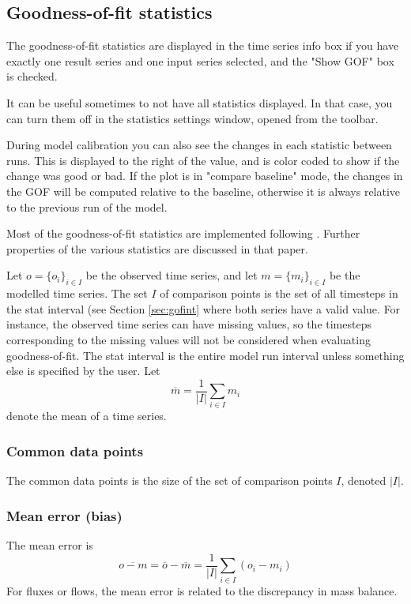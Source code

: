 \documentclass[11pt]{article}
\theoremstyle{definition}
\begin{document}
\subsection{Goodness-of-fit statistics}\label{sec:gof}

The goodness-of-fit statistics are displayed in the time series info box if you have exactly one result series and one input series selected, and the "Show GOF" box is checked.

It can be useful sometimes to not have all statistics displayed. In that case, you can turn them off in the statistics settings window, opened from the toolbar.

During model calibration you can also see the changes in each statistic between runs. This is displayed to the right of the value, and is color coded to show if the change was good or bad. If the plot is in "compare baseline" mode, the changes in the GOF will be computed relative to the baseline, otherwise it is always relative to the previous run of the model.

Most of the goodness-of-fit statistics are implemented following \cite{krause05}. Further properties of the various statistics are discussed in that paper.

Let $o=\{o_i\}_{i\in I}$ be the observed time series, and let $m=\{m_i\}_{i\in I}$ be the modelled time series. The set $I$ of comparison points is the set of all timesteps in the stat interval (see Section \ref{sec:gofint} where both series have a valid value. For instance, the observed time series can have missing values, so the timesteps corresponding to the missing values will not be considered when evaluating goodness-of-fit. The stat interval is the entire model run interval unless something else is specified by the user. Let
\[
\overline{m} = \frac{1}{|I|}\sum_{i\in I}m_i
\]
denote the mean of a time series.

\subsubsection{Common data points}
The common data points is the size of the set of comparison points $I$, denoted $|I|$.

\subsubsection{Mean error (bias)}
The mean error is
\[
\overline{o - m} = \overline{o} -\overline{m} =\frac{1}{|I|} \sum_{i\in I} (o_i - m_i)
\]
For fluxes or flows, the mean error is related to the discrepancy in mass balance.
\end{document}
